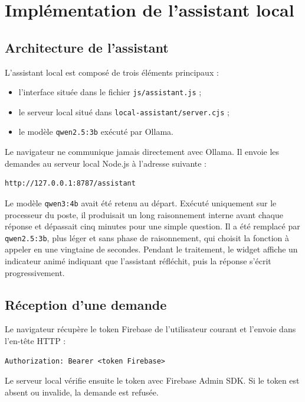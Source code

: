 \documentclass{rapportENSIAS}
\begin{document}
\section{Implémentation de l’assistant local}

\subsection{Architecture de l’assistant}

L’assistant local est composé de trois éléments principaux :

\begin{itemize}
    \item l’interface située dans le fichier \texttt{js/assistant.js} ;
    \item le serveur local situé dans \texttt{local-assistant/server.cjs} ;
    \item le modèle \texttt{qwen2.5:3b} exécuté par Ollama.
\end{itemize}

Le navigateur ne communique jamais directement avec Ollama. Il envoie les demandes au serveur local Node.js à l’adresse suivante :

\begin{verbatim}
http://127.0.0.1:8787/assistant
\end{verbatim}

Le modèle \texttt{qwen3:4b} avait été retenu au départ. Exécuté uniquement sur le processeur du poste, il produisait un long raisonnement interne avant chaque réponse et dépassait cinq minutes pour une simple question. Il a été remplacé par \texttt{qwen2.5:3b}, plus léger et sans phase de raisonnement, qui choisit la fonction à appeler en une vingtaine de secondes. Pendant le traitement, le widget affiche un indicateur animé indiquant que l’assistant réfléchit, puis la réponse s’écrit progressivement.

\subsection{Réception d’une demande}

Le navigateur récupère le token Firebase de l’utilisateur courant et l’envoie dans l’en-tête HTTP :

\begin{verbatim}
Authorization: Bearer <token Firebase>
\end{verbatim}

Le serveur local vérifie ensuite le token avec Firebase Admin SDK. Si le token est absent ou invalide, la demande est refusée.
\end{document}

